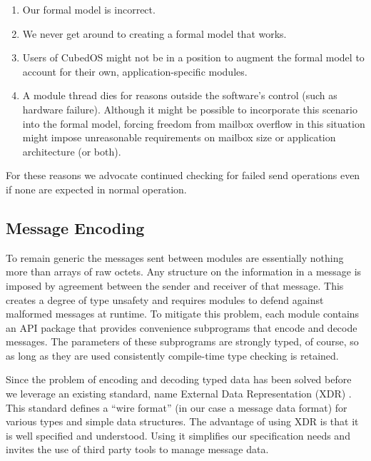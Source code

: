 \begin{enumerate}
\item Our formal model is incorrect.
\item We never get around to creating a formal model that works.
\item Users of CubedOS might not be in a position to augment the formal model to account for
  their own, application-specific modules.
\item A module thread dies for reasons outside the software's control (such as hardware
  failure). Although it might be possible to incorporate this scenario into the formal model,
  forcing freedom from mailbox overflow in this situation might impose unreasonable requirements
  on mailbox size or application architecture (or both).
\end{enumerate}

For these reasons we advocate continued checking for failed send operations even if none are
expected in normal operation.


\subsection{Message Encoding}
\label{design-message-encoding}

To remain generic the messages sent between modules are essentially nothing more than arrays of
raw octets. Any structure on the information in a message is imposed by agreement between the
sender and receiver of that message. This creates a degree of type unsafety and requires modules
to defend against malformed messages at runtime. To mitigate this problem, each module contains
an API package that provides convenience subprograms that encode and decode messages. The
parameters of these subprograms are strongly typed, of course, so as long as they are used
consistently compile-time type checking is retained.

Since the problem of encoding and decoding typed data has been solved before we leverage an
existing standard, name External Data Representation (XDR) \cite{rfc-4506}. This standard
defines a ``wire format'' (in our case a message data format) for various types and simple data
structures. The advantage of using XDR is that it is well specified and understood. Using it
simplifies our specification needs and invites the use of third party tools to manage message
data.

